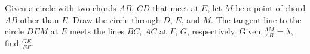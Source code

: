Given a circle with two chords $AB$, $CD$ that meet at $E$, let $M$ be a point of chord $AB$ other than $E$. Draw the circle through $D$, $E$, and $M$. The tangent line to the circle $DEM$ at $E$ meets the lines $BC$, $AC$ at $F$, $G$, respectively. Given $\frac{AM}{AB} = \lambda$, find $\frac{GE}{EF}$.
